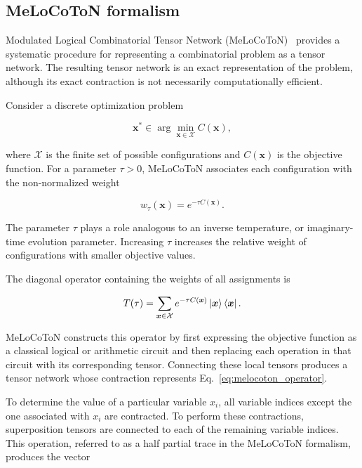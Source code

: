 \documentclass[%
 reprint,
 amsmath,amssymb,
 aps,
 pra,showkeys,
]{revtex4-2}
\begin{document}
\subsection{MeLoCoToN formalism}\label{ssec:melocoton formalism}
Modulated Logical Combinatorial Tensor Network
(MeLoCoToN)~\cite{melocoton} provides a systematic procedure for
representing a combinatorial problem as a tensor network.
The resulting tensor network is an exact representation of the
problem, although its exact contraction is not necessarily
computationally efficient.

Consider a discrete optimization problem

\begin{equation}
\boldsymbol{x}^{*}
\in
\arg\min_{\boldsymbol{x}\in\mathcal{X}}
C(\boldsymbol{x}),
\end{equation}

where $\mathcal{X}$ is the finite set of possible configurations and
$C(\boldsymbol{x})$ is the objective function. For a parameter
$\tau>0$, MeLoCoToN associates each configuration with the non-normalized
weight

\begin{equation}
\label{eq: weight of combination}
w_{\tau}(\boldsymbol{x})
=
e^{-\tau C(\boldsymbol{x})}.
\end{equation}

The parameter $\tau$ plays a role analogous to an inverse temperature,
or imaginary-time evolution parameter. Increasing $\tau$ increases the
relative weight of configurations with smaller objective values.

The diagonal operator containing the weights of all assignments is

\begin{equation}
\label{eq:melocoton_operator}
T(\tau)
=
\sum_{\boldsymbol{x}\in\mathcal{X}}
e^{-\tau C(\boldsymbol{x})}
\ket{\boldsymbol{x}}\bra{\boldsymbol{x}}.
\end{equation}


MeLoCoToN constructs this operator by first expressing the objective
function as a classical logical or arithmetic circuit and then
replacing each operation in that circuit with its corresponding
tensor. Connecting these local tensors produces a tensor network whose
contraction represents Eq.~\eqref{eq:melocoton_operator}.

To determine the value of a particular variable $x_i$, all variable indices except the one associated with $x_i$ are contracted. To perform these contractions, superposition tensors are connected to each of the remaining variable indices. This operation, referred to as a half partial trace in the MeLoCoToN formalism, produces the vector
\end{document}
